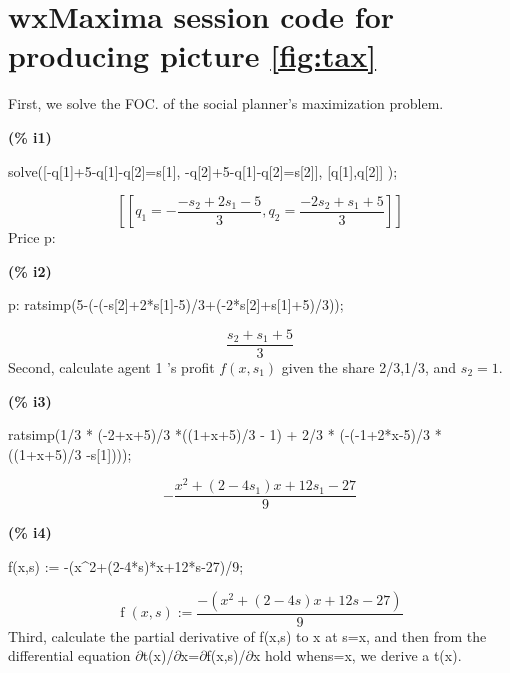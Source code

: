
\chapter{wxMaxima session code for producing picture \ref{fig:tax}} %

\label{Appendix_B} %

First, we solve the FOC. of the social planner's maximization problem. 


\noindent
\begin{minipage}[t]{8ex}\color{red}\bf
(\% i1) 
\end{minipage}
\begin{minipage}[t]{\textwidth}\color{blue}
solve([-q[1]+5-q[1]-q[2]=s[1], -q[2]+5-q[1]-q[2]=s[2]], [q[1],q[2]] );
\end{minipage}
\[\displaystyle
\tag{\% o1} 
[[{q_1}=-\frac{-{s_2}+2 {s_1}-5}{3},{q_2}=\frac{-2 {s_2}+{s_1}+5}{3}]]\mbox{}
\]
Price p: 


\noindent
\begin{minipage}[t]{8ex}\color{red}\bf
(\% i2)
\end{minipage}
\begin{minipage}[t]{\textwidth}\color{blue}
p: ratsimp(5-(-(-s[2]+2*s[1]-5)/3+(-2*s[2]+s[1]+5)/3));
\end{minipage}
\[\displaystyle
\tag{p}
\frac{{s_2}+{s_1}+5}{3}\mbox{}
\]
Second, calculate agent 1 's profit $f(x,s_1)$ given the share 2/3,1/3, and $s_2=1$. 


\noindent
\begin{minipage}[t]{8ex}\color{red}\bf
(\% i3)
\end{minipage}
\begin{minipage}[t]{\textwidth}\color{blue}
 ratsimp(1/3 * (-2+x+5)/3 *((1+x+5)/3 - 1)  + 2/3 * (-(-1+2*x-5)/3 *((1+x+5)/3 -s[1])));
\end{minipage}
\[\displaystyle
\tag{\% o3} 
-\frac{{{x}^{2}}+\left( 2-4 {s_1}\right)  x+12 {s_1}-27}{9}\mbox{}
\]


\noindent
\begin{minipage}[t]{8ex}\color{red}\bf
(\% i4)
\end{minipage}
\begin{minipage}[t]{\textwidth}\color{blue}
f(x,s) := -(x\^{}2+(2-4*s)*x+12*s-27)/9;
\end{minipage}
\[\displaystyle
\tag{\% o4} 
\operatorname{f}\left( x,s\right) :=\frac{-\left( {{x}^{2}}+\left( 2-4 s\right)  x+12 s-27\right) }{9}\mbox{}
\]
Third, calculate the partial derivative of f(x,s) to x at s=x, and then from the differential equation \ensuremath{\partial}t(x)/\ensuremath{\partial}x=\ensuremath{\partial}f(x,s)/\ensuremath{\partial}x hold whens=x, we derive a t(x). 


